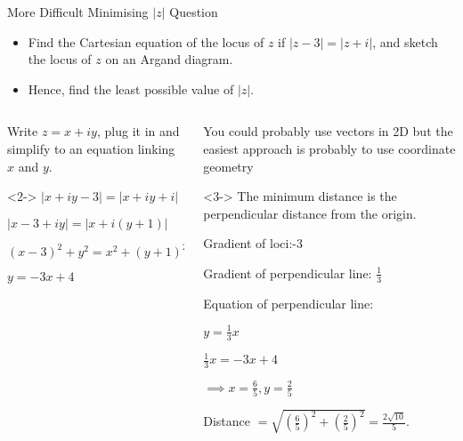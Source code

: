 \documentclass[8pt]{beamer}
\begin{document}
\begin{frame}[shrink=5]{More Difficult Minimising $|z|$ Question}
	\begin{problem}
		\begin{itemize}
			\item Find the Cartesian equation of the locus of $z$ if  $|z-3|=|z+i|$, and sketch the locus of  $z$ on an Argand diagram.
			\item Hence, find the least possible value of  $|z|$.
		\end{itemize}
	\end{problem}
	\begin{columns}
	\begin{column}{.5\linewidth}
		\alert{Write $z=x+iy$, plug it in and simplify to an equation linking  $x$ and  $y$.}
		\begin{solution}<2->
	$|x+iy-3|=|x+iy+i|$

	$|x-3+iy|=|x+i(y+1)|$

	$(x-3)^2+y^2=x^2+(y+1)^2$

	$y=-3x+4$

		\begin{center}
\end{center}
		\end{solution}
	\end{column}
	\begin{column}{.5\linewidth}
		\alert{You could probably use vectors in 2D but the easiest approach is probably to use coordinate geometry}
		\begin{solution}<3->
			The minimum distance is the perpendicular
distance from the origin.

Gradient of loci:-3

Gradient of perpendicular line: $\frac{1}{3}$ 

Equation of perpendicular line:

$y=\frac{1}{3}x$ 

$\frac{1}{3}x=-3x+4$ 

$\implies x=\frac{6}{5}, y=\frac{2}{5}$ 

Distance $=\sqrt{\left( \frac{6}{5} \right)^2+\left( \frac{2}{5} \right)^2  }= \frac{2\sqrt{10} }{5}  $.
		\end{solution}
	\end{column}
	\end{columns}
\end{frame}
\end{document}
